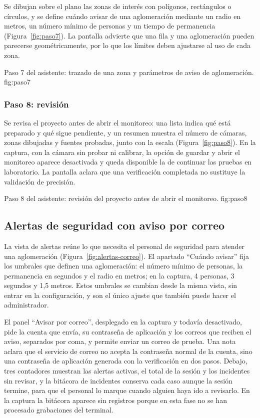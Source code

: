 Se dibujan sobre el plano las zonas de interés con polígonos, rectángulos
o círculos, y se define cuándo avisar de una aglomeración mediante un
radio en metros, un número mínimo de personas y un tiempo de permanencia
(Figura~\ref{fig:paso7}). La pantalla advierte que una fila y una
aglomeración pueden parecerse geométricamente, por lo que los límites
deben ajustarse al uso de cada zona.

  {Paso 7 del asistente: trazado de una zona y parámetros de aviso de
   aglomeración.}
  {fig:paso7}

\subsubsection*{Paso 8: revisión}

Se revisa el proyecto antes de abrir el monitoreo: una lista indica qué
está preparado y qué sigue pendiente, y un resumen muestra el número de
cámaras, zonas dibujadas y fuentes probadas, junto con la escala
(Figura~\ref{fig:paso8}). En la captura, con la cámara sin probar ni
calibrar, la opción de guardar y abrir el monitoreo aparece desactivada y
queda disponible la de continuar las pruebas en laboratorio. La pantalla
aclara que una verificación completada no sustituye la validación de
precisión.

  {Paso 8 del asistente: revisión del proyecto antes de abrir el monitoreo.}
  {fig:paso8}

\subsection{Alertas de seguridad con aviso por correo}
\label{sec:diseno-alertas}

La vista de alertas reúne lo que necesita el personal de seguridad para
atender una aglomeración (Figura~\ref{fig:alertas-correo}). El apartado
\enquote{Cuándo avisar} fija los umbrales que definen una aglomeración: el
número mínimo de personas, la permanencia en segundos y el radio en
metros; en la captura, 4 personas, 3 segundos y 1,5 metros. Estos
umbrales se cambian desde la misma vista, sin entrar en la configuración,
y son el único ajuste que también puede hacer el administrador.

El panel \enquote{Avisar por correo}, desplegado en la captura y todavía
desactivado, pide la cuenta que envía, su contraseña de aplicación y los
correos que reciben el aviso, separados por coma, y permite enviar un
correo de prueba. Una nota aclara que el servicio de correo no acepta la
contraseña normal de la cuenta, sino una contraseña de aplicación
generada con la verificación en dos pasos. Debajo, tres contadores
muestran las alertas activas, el total de la sesión y los incidentes sin
revisar, y la bitácora de incidentes conserva cada caso aunque la sesión
termine, para que el personal lo marque cuando alguien haya ido a
revisarlo. En la captura la bitácora aparece sin registros porque en esta
fase no se han procesado grabaciones del terminal.

